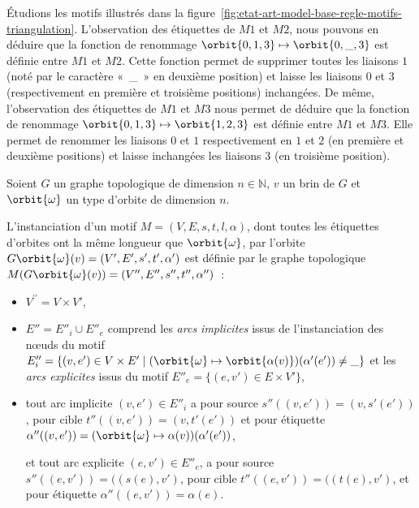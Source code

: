Étudions les motifs illustrés dans la
figure~\ref{fig:etat-art-model-base-regle-motifs-triangulation}. %
L'observation des étiquettes de $M1$ et $M2$, nous pouvons en déduire que la
fonction de renommage $\orbit{0,1,3}\mapsto\orbit{0,\_,3}$ est définie entre $M1$ et
$M2$. %
Cette fonction permet de supprimer toutes les liaisons $1$ (noté par le
caractère «~\_~» en deuxième position) et laisse les liaisons $0$ et $3$
(respectivement en première et troisième positions) inchangées. %
De même, l'observation des étiquettes de $M1$ et $M3$ nous permet de déduire que
la fonction de renommage $\orbit{0,1,3} \mapsto \orbit{1,2,3}$ est définie entre $M1$
et $M3$. %
Elle permet de renommer les liaisons $0$ et $1$ respectivement en $1$ et $2$ (en
première et deuxième positions) et laisse inchangées les liaisons $3$ (en
troisième position). %

\begin{definition}\label{def:instanciation-motif}%
	Soient $G$ un graphe topologique de dimension $n \in \mathbb{N}$, $v$ un brin de $G$ et $\orbit{\omega}$ un type d'orbite de dimension $n$.

	L'instanciation d'un motif $M=(V,E,s,t,l,\alpha)$, dont toutes les étiquettes d'orbites ont la même longueur que $\orbit{\omega}$, par l'orbite $G\orbit{\omega}(v)=(V',E',s',t',\alpha')$ est définie par le graphe topologique $M(G\orbit{\omega}(v))=(V'',E'',s'',t'',\alpha'')$~:
	\begin{itemize}
		\item $V^{\prime\prime}= V \times V'$,

		\item $E''=E''_i \cup E''_e$ comprend les \emph{arcs implicites} issus de l'instanciation des n\oe uds du motif $E''_i = \{ (v, e') \in V \times E' \mid (\orbit{\omega} \mapsto \orbit{\alpha(v)})(\alpha'(e')) \neq \_ \}$ et les \emph{arcs explicites} issus du motif $E''_e = \{ (e, v') \in E \times V' \}$,

		\item tout arc implicite $(v,e') \in E''_i$ a pour source $s''((v,e'))=(v,s'(e'))$, pour cible $t''((v,e'))=(v,t'(e'))$ et pour étiquette $\alpha''((v,e'))=(\orbit{\omega} \mapsto \alpha(v))(\alpha'(e'))$,

		      et tout arc explicite $(e,v') \in E''_e$, a pour source $s''((e,v')) = ((s(e),v')$, pour cible $t''((e,v')) = ((t(e),v')$, et pour étiquette $\alpha''((e, v')) = \alpha(e)$.
	\end{itemize}
\end{definition}

